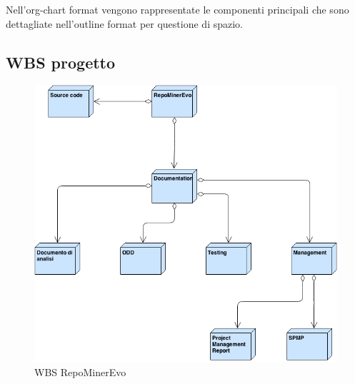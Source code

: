 Nell'org-chart format vengono rappresentate le componenti principali che sono dettagliate nell'outline format per questione di spazio.
\subsection{WBS progetto}
\begin{figure}[ht]
\centering
\includegraphics[width=\textwidth]{img/WBS_master.png}
\caption{WBS RepoMinerEvo} 
\end{figure}
\clearpage


